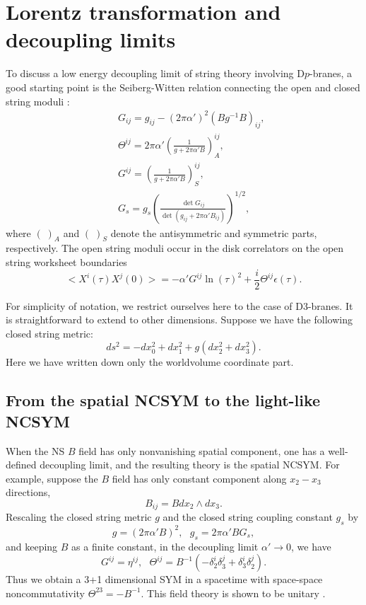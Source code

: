 \documentclass[a4paper,12pt]{article}
\newcommand{\sect}[1]{\setcounter{equation}{0}\section{#1}}
\begin{document}

\sect{Lorentz transformation and decoupling limits }

To discuss a low energy decoupling limit of string theory involving
D$p$-branes, a good starting point is the Seiberg-Witten
relation connecting the open and closed string moduli \cite{Seib1}:
\begin{eqnarray}
&& G_{ij}=g_{ij}-(2\pi\alpha')^2 (Bg^{-1}B)_{ij}, \nonumber\\
&& \Theta^{ij}=2\pi \alpha' \left(\frac{1}{g+2\pi\alpha' B}
   \right)^{ij}_A, \nonumber\\
&& G^{ij}=\left(\frac{1}{g + 2\pi \alpha' B}\right)_S^{ij},\nonumber\\
&& G_s =g_s\left (\frac{\det G_{ij}}
   {\det(g_{ij} +2\pi\alpha' B_{ij})}\right)^{1/2},
\end{eqnarray}
where $(\;)_A$ and $(\;)_S$ denote the antisymmetric and symmetric parts,
respectively. The open string moduli occur in the disk correlators on the
open string worksheet boundaries
\begin{equation}
<X^i(\tau)X^j(0)> = -\alpha' G^{ij} \ln(\tau)^2 +\frac{i}{2}\Theta ^{ij}
 \epsilon (\tau).
\end{equation}

For simplicity of notation, we restrict ourselves here to the case of
D3-branes. It is straightforward to extend to other dimensions. Suppose
we have the following closed string metric:
\begin{equation}
\label{coor}
ds^2 =-dx_0^2 +dx^2_1 +g (dx_2^2 +dx_3^2).
\end{equation}
Here we have written down only the worldvolume coordinate part.

\subsection{From the spatial NCSYM to the light-like NCSYM}

When the NS $B$ field has only nonvanishing spatial component, one has a
well-defined decoupling limit, and the resulting theory is the spatial
NCSYM. For example, suppose the $B$ field has only constant
component along $x_2-x_3$ directions,
\begin{equation}
B_{ij}=B dx_2\wedge dx_3.
\end{equation}
Rescaling the closed string metric $g$ and the closed string coupling
constant $g_s$ by
\begin{equation}
\label{ncsym}
g=(2\pi \alpha' B)^2,\ \ \
g_s=2\pi \alpha'B G_s,
\end{equation}
and keeping $B$ as a finite constant, in the decoupling limit $\alpha' \to 0$,
we have
\begin{equation}
G^{ij}=\eta^{ij}, \ \ \ \Theta^{ij}=B^{-1}(-\delta^i_2\delta^j_3
 +\delta^i_3\delta^j_2).
\end{equation}
Thus we obtain a 3+1 dimensional SYM in a spacetime with space-space
noncommutativity $\Theta^{23}=-B^{-1}$. This field theory is shown to be
unitary \cite{Gomi}.
\end{document}
